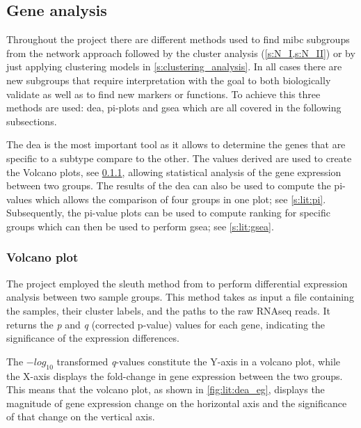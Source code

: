 \subsection{Gene analysis} \label{s:lit:gene_analysis}


Throughout the project there are different methods used to find \acrlong{mibc} subgroups from the network approach followed by the cluster analysis (\cref{s:N_I,s:N_II}) or by just applying clustering models in \cref{s:clustering_analysis}. In all cases there are new subgroups that require interpretation with the goal to both biologically validate as well as to find new markers or functions. To achieve this three methods are used: \acrlong{dea}, pi-plots and \acrlong{gsea} which are all covered in the following subsections. 

The \acrshort{dea} is the most important tool as it allows to determine the genes that are specific to a subtype compare to the other. The values derived are used to create the Volcano plots, see \cref{s:lit:dea}, allowing statistical analysis of the gene expression between two groups. The results of the \acrshort{dea} can also be used to compute the pi-values \citep{Xiao2014-zn} which allows the comparison of four groups in one plot; see \cref{s:lit:pi}. Subsequently, the pi-value plots can be used to compute ranking for specific groups which can then be used to perform \acrlong{gsea}; see \cref{s:lit:gsea}.


\subsubsection{Volcano plot} \label{s:lit:dea}


The project employed the sleuth method from \citeauthor{Pimentel2017-xp} to perform differential expression analysis between two sample groups. This method takes as input a file containing the samples, their cluster labels, and the paths to the raw RNAseq reads. It returns the \textit{p} and \textit{q} (corrected p-value) values for each gene, indicating the significance of the expression differences.

The $-log_{10}$ transformed \textit{q}-values constitute the Y-axis in a volcano plot, while the X-axis displays the fold-change in gene expression between the two groups. This means that the volcano plot, as shown in \cref{fig:lit:dea_eg}, displays the magnitude of gene expression change on the horizontal axis and the significance of that change on the vertical axis.

